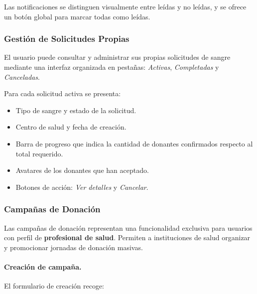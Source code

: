 \documentclass[12pt, a4paper]{article}
\begin{document}
Las notificaciones se distinguen visualmente entre leídas y no leídas, y se ofrece un botón global para marcar todas como leídas.

\subsubsection{Gestión de Solicitudes Propias}

El usuario puede consultar y administrar sus propias solicitudes de sangre mediante una interfaz organizada en pestañas: \textit{Activas}, \textit{Completadas} y \textit{Canceladas}.

Para cada solicitud activa se presenta:
\begin{itemize}
    \item Tipo de sangre y estado de la solicitud.
    \item Centro de salud y fecha de creación.
    \item Barra de progreso que indica la cantidad de donantes confirmados respecto al total requerido.
    \item Avatares de los donantes que han aceptado.
    \item Botones de acción: \textit{Ver detalles} y \textit{Cancelar}.
\end{itemize}

\subsubsection{Campañas de Donación}

Las campañas de donación representan una funcionalidad exclusiva para usuarios con perfil de \textbf{profesional de salud}. Permiten a instituciones de salud organizar y promocionar jornadas de donación masivas.

\paragraph{Creación de campaña.}
El formulario de creación recoge:
\end{document}
